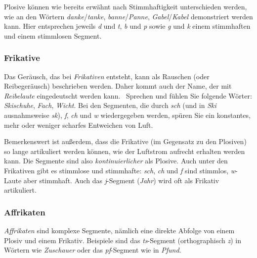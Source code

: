 
Plosive können wie bereits erwähnt nach Stimmhaftigkeit unterschieden werden, wie an den Wörtern \textit{danke}/\textit{tanke}, \textit{banne}/\textit{Panne}, \textit{Gabel}/\textit{Kabel} demonstriert werden kann.
Hier entsprechen jeweils \textit{d} und \textit{t}, \textit{b} und \textit{p} sowie \textit{g} und \textit{k} einem stimmhaften und einem stimmlosen Segment.

\subsubsection{Frikative}

Das Geräusch, das bei \textit{Frikativen} entsteht, kann als Rauschen (oder Reibegeräusch) beschrieben werden.
Daher kommt auch der Name, der mit \textit{Reibelaute} eingedeutscht werden kann.
\TuBegin~Sprechen und fühlen Sie folgende Wörter: \textit{Skischuhe}, \textit{Fach}, \textit{Wicht}.
Bei den Segmenten, die durch \textit{sch} (und in \textit{Ski} ausnahmsweise \textit{sk}), \textit{f}, \textit{ch} und \textit{w} wiedergegeben werden, spüren Sie ein konstantes, mehr oder weniger scharfes Entweichen von Luft.


Bemerkenswert ist außerdem, dass die Frikative (im Gegensatz zu den Plosiven) so lange artikuliert werden können, wie der Luftstrom aufrecht erhalten werden kann.
Die Segmente sind also \textit{kontinuierlicher} als Plosive.
Auch unter den Frikativen gibt es stimmlose und stimmhafte: \textit{sch}, \textit{ch} und \textit{f} sind stimmlos, \textit{w}-Laute aber \zB stimmhaft.
Auch das \textit{j}-Segment (\textit{Jahr}) wird oft als Frikativ artikuliert.

\subsubsection{Affrikaten}

\textit{Affrikaten} sind komplexe Segmente, nämlich eine direkte Abfolge von einem Plosiv und einem Frikativ.
Beispiele sind das \textit{ts}-Segment (orthographisch \textit{z}) in Wörtern wie \textit{Zuschauer} oder das \textit{pf}-Segment wie in \textit{Pfund}.

